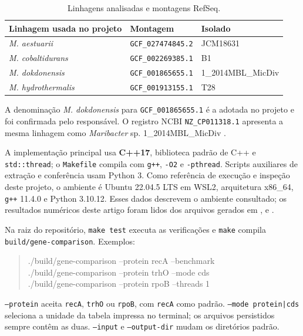\documentclass[12pt]{article}
\begin{document}
\begin{table}[ht]
\centering\small
\caption{Linhagens analisadas e montagens RefSeq.}
\label{tab:montagens}
\begin{tabular}{lll}
\hline
Linhagem usada no projeto & Montagem & Isolado \\
\hline
\textit{M. aestuarii} & \texttt{GCF\_027474845.2} & JCM18631 \\
\textit{M. cobaltidurans} & \texttt{GCF\_002269385.1} & B1 \\
\textit{M. dokdonensis} & \texttt{GCF\_001865655.1} & 1\_2014MBL\_MicDiv \\
\textit{M. hydrothermalis} & \texttt{GCF\_001913155.1} & T28 \\
\hline
\end{tabular}
\end{table}

A denominação \textit{M. dokdonensis} para \texttt{GCF\_001865655.1} é a
adotada no projeto e foi confirmada pelo responsável. O registro NCBI
\texttt{NZ\_CP011318.1} apresenta a mesma linhagem como \textit{Maribacter}
sp. 1\_2014MBL\_MicDiv \cite{ncbiassembly}.

A implementação principal usa \textbf{C++17}, biblioteca padrão de C++ e
\texttt{std::thread}; o \texttt{Makefile} compila com \texttt{g++},
\texttt{-O2} e \texttt{-pthread}. Scripts auxiliares de extração e conferência
usam Python 3. Como referência de execução e inspeção deste projeto, o
ambiente é Ubuntu 22.04.5 LTS em WSL2, arquitetura x86\_64, \texttt{g++}
11.4.0 e Python 3.10.12. Esses dados descrevem o ambiente consultado; os
resultados numéricos deste artigo foram lidos dos arquivos gerados em
,  e .

Na raiz do repositório, \texttt{make test} executa as verificações e
\texttt{make} compila \texttt{build/gene-comparison}. Exemplos:
\begin{quote}\ttfamily\small
./build/gene-comparison --protein recA --benchmark\\
./build/gene-comparison --protein trhO --mode cds\\
./build/gene-comparison --protein rpoB --threads 1
\end{quote}
\texttt{--protein} aceita \texttt{recA}, \texttt{trhO} ou \texttt{rpoB}, com
\texttt{recA} como padrão. \texttt{--mode protein|cds} seleciona a unidade da
tabela impressa no terminal; os arquivos persistidos sempre contêm as duas.
\texttt{--input} e \texttt{--output-dir} mudam os diretórios padrão.
\end{document}
